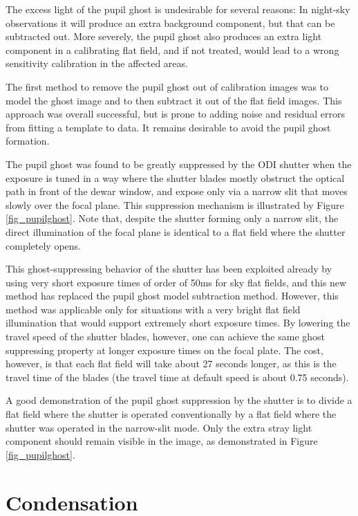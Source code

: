 \documentclass[]{spieman}
\begin{document}
The excess light of the pupil ghost is undesirable for several reasons: In
night-sky observations it will produce an extra background component, but that
can be subtracted out. More severely, the pupil ghost also produces an extra
light component in a calibrating flat field, and if not treated, would lead to a
wrong sensitivity calibration in the affected areas.

The first method to remove the pupil ghost out of calibration images was to
model the ghost image and to then subtract it out of the flat field images. This
approach was overall successful, but is prone to adding noise and residual
errors from fitting a template to data. It remains desirable to avoid the pupil
ghost formation.

The pupil ghost was found to be greatly suppressed by the ODI shutter when the
exposure is tuned in a way where the shutter blades mostly obstruct the optical
path in front of the dewar window, and expose only via a narrow slit that moves
slowly over the focal plane. This suppression mechanism is illustrated by Figure
\ref{fig_pupilghost}. Note that, despite the shutter forming only a narrow slit,
the direct illumination of the focal plane is identical to a flat field where
the shutter completely opens.

This ghost-suppressing behavior of the shutter has been exploited already by
using very short exposure times of order of 50ms for sky flat fields, and this
new method has replaced the pupil ghost model subtraction method. However,
 this method was applicable only for situations with a very
bright flat field illumination that would support extremely short exposure
times. By lowering the travel speed of the shutter blades, however, one can
achieve the same ghost suppressing property at longer exposure times on the
focal plate. The cost, however, is that each flat field will take about 27
seconds longer, as this is the travel time of the blades (the travel time at
default speed is about 0.75 seconds).

A good demonstration of the pupil ghost suppression by the shutter is to divide
a flat field where the shutter is operated conventionally by a flat field where
the shutter was operated in the narrow-slit mode. Only the extra stray light
component should remain visible in the image, as demonstrated in Figure
\ref{fig_pupilghost}.


\section{Condensation}
\end{document}
